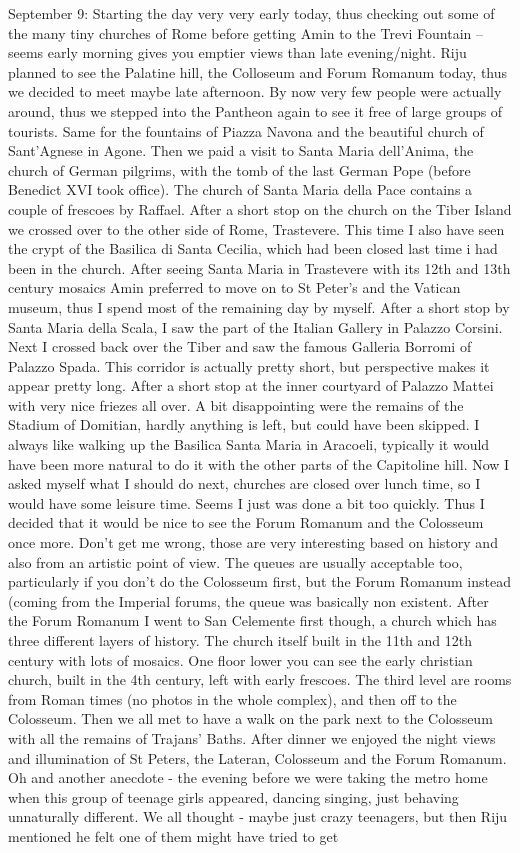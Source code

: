 September 9:
Starting the day very very early today, thus checking out some of the many tiny churches of Rome before getting Amin to the Trevi Fountain -- seems early morning gives you emptier views than late evening/night. Riju planned to see the Palatine hill, the Colloseum and Forum Romanum today, thus we decided to meet maybe late afternoon. By now very few people were actually around, thus we stepped into the Pantheon again to see it free of large groups of tourists. Same for the fountains of Piazza Navona and the beautiful church of Sant'Agnese in Agone. Then we paid a visit to Santa Maria dell'Anima, the church of German pilgrims, with the tomb of the last German Pope (before Benedict XVI took office). The church of Santa Maria della Pace contains a couple of frescoes by Raffael. After a short stop on the church on the Tiber Island we crossed over to the other side of Rome, Trastevere. This time I also have seen the crypt of the Basilica di Santa Cecilia, which had been closed last time i had been in the church. After seeing Santa Maria in Trastevere with its 12th and 13th century mosaics Amin preferred to move on to St Peter's and the Vatican museum, thus I spend most of the remaining day by myself. After a short stop by Santa Maria della Scala, I saw the part of the Italian Gallery in Palazzo Corsini. Next I crossed back over the Tiber and saw the famous Galleria Borromi of Palazzo Spada. This corridor is actually pretty short, but perspective makes it appear pretty long. After a short stop at the inner courtyard of Palazzo Mattei with very nice friezes all over. A bit disappointing were the remains of the Stadium of Domitian, hardly anything is left, but could have been skipped. I always like walking up the Basilica Santa Maria in Aracoeli, typically it would have been more natural to do it with the other parts of the Capitoline hill. Now I asked myself what I should do next, churches are closed over lunch time, so I would have some leisure time. Seems I just was done a bit too quickly. Thus I decided that it would be nice to see the Forum Romanum and the Colosseum once more. Don't get me wrong, those are very interesting based on history and also from an artistic point of view. The queues are usually acceptable too, particularly if you don't do the Colosseum first, but the Forum Romanum instead (coming from the Imperial forums, the queue was basically non existent. After the Forum Romanum I went to San Celemente first though, a church which has three different layers of history. The church itself built in the 11th and 12th century with lots of mosaics. One floor lower you can see the early christian church, built in the 4th century, left with early frescoes. The third level are rooms from Roman times (no photos in the whole complex), and then off to the Colosseum. Then we all met to have a walk on the park next to the Colosseum with all the remains of Trajans' Baths. After dinner we enjoyed the night views and illumination of St Peters, the Lateran, Colosseum and the Forum Romanum. Oh and another anecdote - the evening before we were taking the metro home when this group of teenage girls appeared, dancing singing, just behaving unnaturally different. We all thought - maybe just crazy teenagers, but then Riju mentioned he felt one of them might have tried to get 